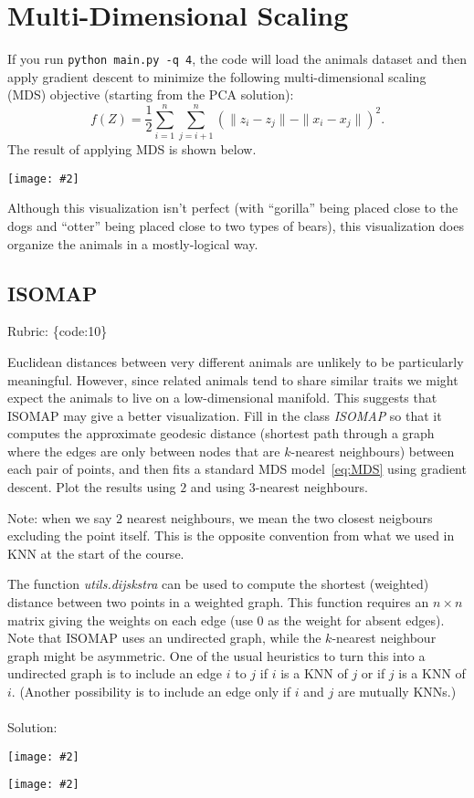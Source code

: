 \documentclass{article}
\def\rubric#1{\gre{Rubric: \{#1\}}}{}
\def\blu#1{{\color{blu}#1}}
\def\gre#1{{\color{gre}#1}}
\def\norm#1{\|#1\|}
\newcommand{\centerfig}[2]{\begin{center}\texttt{[image: \#2]}\end{center}}
\begin{document}
\section{Multi-Dimensional Scaling}

If you run \verb|python main.py -q 4|, the code will load the animals dataset and then apply gradient descent to minimize the following multi-dimensional scaling (MDS) objective (starting from the PCA solution):
\begin{equation}
\label{eq:MDS}
f(Z) =  \frac{1}{2}\sum_{i=1}^n\sum_{j=i+1}^n (  \norm{z_i - z_j} - \norm{x_i - x_j})^2.
\end{equation}
 The result of applying MDS is shown below.
\centerfig{.5}{../figs/MDS_animals.png}
Although this visualization isn't perfect (with ``gorilla'' being placed close to the dogs and ``otter'' being placed close to two types of bears), this visualization does organize the animals in a mostly-logical way.


\subsection{ISOMAP}
\rubric{code:10}

Euclidean distances between very different animals are unlikely to be particularly meaningful.
However, since related animals tend to share similar traits we might expect the animals to live on a low-dimensional manifold.
This suggests that ISOMAP may give a better visualization.
Fill in the class \emph{ISOMAP} so that it computes the approximate geodesic distance
(shortest path through a graph where the edges are only between nodes that are $k$-nearest neighbours) between each pair of points,
and then fits a standard MDS model~\eqref{eq:MDS} using gradient descent. \blu{Plot the results using $2$ and using $3$-nearest neighbours}.

Note: when we say $2$ nearest neighbours, we mean the two closest neigbours excluding the point itself. This is the opposite convention from what we used in KNN at the start of the course.

The function \emph{utils.dijskstra} can be used to compute the shortest (weighted) distance between two points in a weighted graph.
This function requires an $n \times n$ matrix giving the weights on each edge (use $0$ as the weight for absent edges).
Note that ISOMAP uses an undirected graph, while the $k$-nearest neighbour graph might be asymmetric.
One of the usual heuristics to turn this into a undirected graph is to include an edge $i$ to $j$ if $i$ is a KNN of $j$ or if $j$ is a KNN of $i$.
(Another possibility is to include an edge only if $i$ and $j$ are mutually KNNs.) \\ \\
\gre{Solution:}
\centerfig{.5}{../figs/ISOMAP2_animals.png}
\centerfig{.5}{../figs/ISOMAP3_animals.png}
\end{document}
